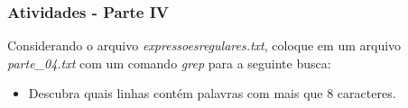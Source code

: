 \documentclass{beamer}
\begin{document}
   \begin{frame}
      \frametitle{Atividades - Parte IV}
      Considerando o arquivo \textit{expressoesregulares.txt}, coloque em um arquivo \textit{parte\_04.txt} com um comando \textit{grep} para a seguinte busca:
      \begin{itemize}
         \item Descubra quais linhas contém palavras com mais que 8 caracteres.
      \end{itemize}
   \end{frame}
\end{document}
